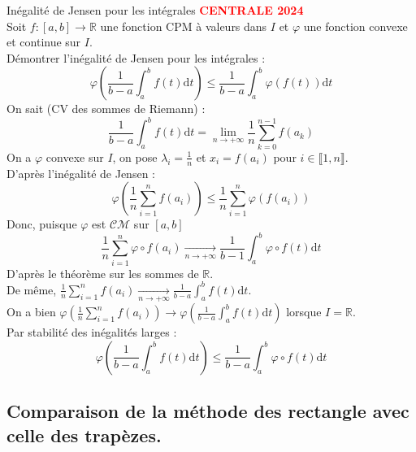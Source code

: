 \documentclass[11pt]{article}
\newcommand*{\R}{\mathbb{R}}
\newcommand*{\CM}{\mathcal{CM}}
\newcommand{\0}{\varnothing}
\renewcommand*{\l}{\lambda}
\newcommand*{\lb}{\llbracket}
\newcommand*{\rb}{\rrbracket}
\newcommand{\dt}{\textrm{d}t}
\renewcommand*{\phi}{\varphi}
\begin{document}
\begin{ex}{Inégalité de Jensen pour les intégrales}{}
    \textcolor{red}{\textbf{CENTRALE 2024}}\\
    Soit $f:[a,b]\to\R$ une fonction CPM à valeurs dans $I$ et $\phi$ une fonction convexe et continue sur $I$.\\
    Démontrer l'inégalité de Jensen pour les intégrales :
    \begin{equation*}
        \phi\left(\frac{1}{b-a}\int_a^bf(t)\dt\right) \leq \frac{1}{b-a}\int_a^b\phi(f(t))\dt
    \end{equation*}
    \tcblower
    On sait (CV des sommes de Riemann) :
    \begin{equation*}
        \frac{1}{b-a}\int_a^bf(t)\dt=\lim_{n\to+\infty}\frac{1}{n}\sum_{k=0}^{n-1}f(a_k)
    \end{equation*}
    On a $\phi$ convexe sur $I$, on pose $\l_i=\frac{1}{n}$ et $x_i=f(a_i)$ pour $i\in\lb1,n\rb$.\\
    D'après l'inégalité de Jensen :
    \begin{equation*}
        \phi\left(\frac{1}{n}\sum_{i=1}^nf(a_i)\right)\leq\frac{1}{n}\sum_{i=1}^n\phi(f(a_i))
    \end{equation*}
    Donc, puisque $\phi$ est $\CM$ sur $[a,b]$
    \begin{equation*}
        \frac{1}{n}\sum_{i=1}^n\phi\circ f(a_i) \xrightarrow[n\to+\infty]{}\frac{1}{b-1}\int_a^b\phi\circ f(t)\dt
    \end{equation*}
    D'après le théorème sur les sommes de $\R$.\\
    De même, $\frac{1}{n}\sum_{i=1}^nf(a_i)\xrightarrow[n\to+\infty]{}\frac{1}{b-a}\int_a^bf(t)\dt$.\\
    On a bien $\phi\left(\frac{1}{n}\sum_{i=1}^nf(a_i)\right)\to\phi\left(\frac{1}{b-a}\int_a^bf(t)\dt\right)$ lorsque $I=\R$.\\
    Par stabilité des inégalités larges :
    \begin{equation*}
        \phi\left(\frac{1}{b-a}\int_a^bf(t)\dt\right)\leq\frac{1}{b-a}\int_a^b\phi\circ f(t)\dt
    \end{equation*}
\end{ex}

\pagebreak

\subsection{Comparaison de la méthode des rectangle avec celle des trapèzes.}
\end{document}
